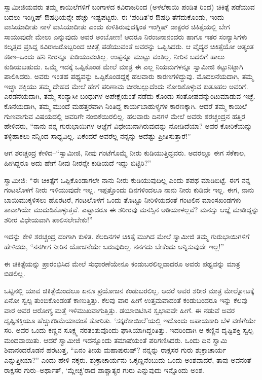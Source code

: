 ಸ್ವಾಮೀಜಿಯವರು ತಮ್ಮ ಕಾಯಿಲೆಗಳಿಗೆ ಬಂಗಾಳದ ಕವಿರಾಜರಿಂದ (ಅಳಲೆಕಾಯಿ ಪಂಡಿತ ರಿಂದ) ಚಿಕಿತ್ಸೆ ಪಡೆಯುವ ಬದಲು ಇಂಗ್ಲಿಷ್ ಔಷಧಿಯನ್ನೇ ಹೆಚ್ಚು ಇಷ್ಟಪಟ್ಟರು. ಈ ‘ಪಂಡಿತ’ರ ಔಷಧಿ ತೆಗೆದುಕೊಂಡು, ಇಂದು ವಾಸಿಯಾದೀತು ನಾಳೆ ವಾಸಿಯಾದೀತು ಎಂದು ಕುಳಿತಿರುವುದಕ್ಕಿಂತ ಇಂಗ್ಲಿಷ್ ಡಾಕ್ಟರರ ಚಿಕಿತ್ಸೆಯಲ್ಲಿ ಬೇಗ ಸಾಯುವುದೇ ಮೇಲು ಎನ್ನುವುದು ಅವರ ಅಂಬೋಣ! ಆದರೂ ನಿರಂಜನಾನಂದರು ಹಾಗೂ ಇತರ ಸಂನ್ಯಾಸಿಗಳು ಕಲ್ಕತ್ತದ ಪ್ರಸಿದ್ದ ಕವಿರಾಜರೊಬ್ಬರಿಂದ ಚಿಕಿತ್ಸೆ ಪಡೆಯುವಂತೆ ಅವರನ್ನು ಒಪ್ಪಿಸಿದರು. ಆ ವೈದ್ಯರ ಚಿಕಿತ್ಸೆಯೋ ಅತ್ಯಂತ ಕಠಿಣ–ಒಂದು ಹನಿ ನೀರನ್ನೂ ಕುಡಿಯುವಂತಿಲ್ಲ. ಉಪ್ಪನ್ನೂ ಮುಟ್ಟು ವಂತಿಲ್ಲ. ನೀರಿನ ಬದಲಿಗೆ ಹಾಲು ಕುಡಿಯಬಹುದು. ಒಮ್ಮೆ ಇದಕ್ಕೆ ಒಪ್ಪಿಕೊಂಡ ಮೇಲೆ ಮಾತ್ರ ಈ ಎಲ್ಲ ನಿಯಮಗಳನ್ನೂ ಸ್ವಾಮೀಜಿ ಕಟ್ಟುನಿಟ್ಟಾಗಿ ಪಾಲಿಸಿದರು. ಅವರು ಇಂತಹ ಪಥ್ಯವನ್ನು ಒಪ್ಪಿಕೊಂಡದ್ದಕ್ಕೆ ಹಲವಾರು ಕಾರಣಗಳಿದ್ದುವು. ಮೊದಲನೆಯದಾಗಿ, ತಮ್ಮ ಇಚ್ಛಾ ಶಕ್ತಿಯು ತಮ್ಮ ದೇಹದ ಮೇಲೆ ಹೇಗೆ ಪರಿಣಾಮ ಬೀರಬಲ್ಲುದೆಂದು ನೋಡಿಕೊಳ್ಳುವ ಕುತೂಹಲ ಅವರಿಗೆ. ಎರಡನೆಯದಾಗಿ, ತಮ್ಮ ಸಂನ್ಯಾಸೀ ಬಂಧುಗಳ ಅಪೇಕ್ಷೆಯಂತೆ ನಡೆದು ಕೊಂಡು ಸಂತೋಷವನ್ನುಂಟುಮಾಡುವ ಇಚ್ಛೆ. ಕೊನೆಯದಾಗಿ, ತಮ್ಮ ಮುಂದೆ ಮಹತ್ತರವಾಗಿ ನಿಂತಿದ್ದ ಕಾರ್ಯಬಾಹುಳ್ಯಗಳ ಕಾರಣಕ್ಕಾಗಿ. ಆದರೆ ತಮ್ಮ ಕಾಯಿಲೆ ಗುಣವಾಗುವ ವಿಷಯದಲ್ಲಿ ಅವರಿಗೇ ನಂಬಿಕೆಯಿರಲಿಲ್ಲ. ಹಲವಾರು ದಿನಗಳ ಮೇಲೆ ಅವರು ಶರಚ್ಚಂದ್ರನ ಹತ್ತಿರ ಹೇಳಿದರು, “ನಾನು ನನ್ನ ಗುರುಭಾಯಿಗಳ ಆಜ್ಞೆಗೆ ವಿಧೇಯನಾಗಿರುವುದನ್ನು ನೋಡಿದೆಯಾ? ಅವರ ಕೋರಿಕೆಯನ್ನು ತಳ್ಳಿಹಾಕಲು ನನ್ನಿಂದ ಸಾಧ್ಯವಿಲ್ಲ. ಏಕೆಂದರೆ ಅವರೆಲ್ಲ ನನ್ನನ್ನು ಅದೆಷ್ಟು ಪ್ರೀತಿಸುತ್ತಾರೆ!”

ಆಗ ಶರಚ್ಚಂದ್ರ ಕೇಳಿದ–“ಸ್ವಾಮೀಜಿ, ನೀವು ಗಂಟೆಗೊಮ್ಮೆ ನೀರು ಕುಡಿಯುತ್ತಿದ್ದವರು. ಅದರಲ್ಲೂ ಈಗ ಸೆಕೆಕಾಲ, ಹೀಗಿದ್ದರೂ ಅದು ಹೇಗೆ ನೀವು ನೀರನ್ನೇ ಕುಡಿಯದೆ ಇದ್ದು ಬಿಟ್ಟಿರಿ?”

ಸ್ವಾಮೀಜಿ: “ಈ ಚಿಕಿತ್ಸೆಗೆ ಒಪ್ಪಿಕೊಂಡಾಗಲೇ ನಾನು ನೀರು ಕುಡಿಯುವುದಿಲ್ಲ ಎಂದು ಶಪಥ ಮಾಡಿಬಿಟ್ಟೆ. ಈಗ ನನ್ನ ಗಂಟಲೊಳಗೆ ನೀರು ಇಳಿಯುವುದೇ ಇಲ್ಲ. ಇಪ್ಪತ್ತೊಂದು ದಿನಗಳಿಂದಲೂ ನಾನು ನೀರು ಕುಡಿದೇ ಇಲ್ಲ. ಈಗ, ನಾನು ಬಾಯಿಮುಕ್ಕಳಿಸಲು ಹೊರಟರೆ, ಗಂಟಲೊಳಗೆ ಒಂದು ತೊಟ್ಟೂ ನೀರಿಳಿಯದಂತೆ ಗಂಟಲಿನ ಮಾಂಸಖಂಡಗಳು ತಾವಾಗಿಯೇ ಮುದುಡಿಕೊಳ್ಳುತ್ತವೆ. ಎಷ್ಟಾದರೂ ಈ ಶರೀರವು ಮನಸ್ಸಿನ ಅಡಿಯಾಳಲ್ಲವೆ? ಮನಸ್ಸು ಆಜ್ಞೆ ಮಾಡಿದ್ದನ್ನು ಶರೀರ ವಿಧೇಯವಾಗಿ ಪಾಲಿಸಲೇಬೇಕು!”

ಇದನ್ನು ಕೇಳಿ ಶರಚ್ಚಂದ್ರ ದಂಗಾಗಿ ಕುಳಿತ. ಕೆಲದಿನಗಳ ಚಿಕಿತ್ಸೆ ಮುಗಿದ ಮೇಲೆ ಸ್ವಾಮೀಜಿ ತಮ್ಮ ಗುರುಭಾಯಿಗಳಿಗೆ ಹೇಳಿದರು, “ನನಗೀಗ ನೀರಿನ ಯೋಚನೆಯೇ ಬರುವುದಿಲ್ಲ. ನನಗದು ಬೇಕೆಂದು ಅನ್ನಿಸುವುದೇ ಇಲ್ಲ!”

ಈ ಚಿಕಿತ್ಸೆಯನ್ನು ಪ್ರಾರಂಭಿಸಿದ ಮೇಲೆ ಸುಧಾರಣೆಯೇನೂ ಕಂಡುಬರಲಿಲ್ಲವಾದರೂ ಅವರು ಪಥ್ಯವನ್ನು ಮಾತ್ರ ಬಿಡಲಿಲ್ಲ.

ಒಟ್ಟಿನಲ್ಲಿ ಯಾವ ಚಿಕಿತ್ಸೆಯಿಂದಲೂ ಏನೂ ಪ್ರಯೋಜನ ಕಂಡುಬರಲಿಲ್ಲ. ಆದರೆ ಅವರ ಶರೀರ ಮಾತ್ರ ಮೇಲ್ನೋಟಕ್ಕೆ ಏನೋ ಸ್ವಲ್ಪ ತುಂಬಿಕೊಂಡಂತೆ ಕಾಣುತ್ತಿತ್ತು. ಕೆಲವು ವಾರ ಹೀಗೆ ಉತ್ತಮವಾದಂತೆ ಕಂಡುಬಂದರೂ ಇನ್ನು ಕೆಲವು ವಾರ ಅವರ ಆರೋಗ್ಯ ಮತ್ತೆ ಇಳಿಮುಖವಾಗುತ್ತಿತ್ತು. ಡಯಾಬಿಟಿಸಿನ ಸ್ವಭಾವವೇ ಹೀಗೆ. ಈ ನಡುವೆ ಅವರ ದೃಷ್ಟಿಶಕ್ತಿಯೂ ಹೆಚ್ಚುಕಡಿಮೆಯಾದಂತೆ ತೋರಿತು. ‘ಸಕ್ಕರೆಕಾಯಿಲೆ’ಯಲ್ಲಿ ಇದೊಂದು ಅಪಾಯಕಾರಿ ಬೆಳ ವಣಿಗೆಯೇ ಸರಿ. ಅವರ ಒಂದು ಕಣ್ಣಿನ ಸೂಕ್ಷ್ಮ ನರತಂತುವೊಂದು ಘಾಸಿಯಾಗಿದ್ದಂತಿತ್ತು. ಇದರಿಂದಾಗಿ ಆ ಕಣ್ಣಿನ ದೃಷ್ಟಿಶಕ್ತಿ ಸ್ವಲ್ಪ ಮಂದವಾಯಿತು. ಆದರೆ ಸ್ವಾಮೀಜಿ ಇದನ್ನೊಂದು ತಮಾಷೆಯಂತೆ ಪರಿಗಣಿಸಿದರು. ಒಂದು ದಿನ ಸ್ವಾಮಿ ಶಿವಾನಂದರೊಡನೆ ಹರಟುತ್ತ, “ಏನಂ ತೀಯ ಮಹಾಪುರುಷ್? ನನ್ನನ್ನು ರಾಕ್ಷಸರ ಗುರು ಶುಕ್ರಾಚಾರ್ಯ ಎನ್ನುತ್ತೀಯಾ?” ಎಂದು ಹೇಳಿ ನಕ್ಕರು. ಶುಕ್ರಾಚಾರ್ಯನು ಒಕ್ಕಣ್ಣನೆಂಬುದು ಒಂದು ಅಂಶವಾದರೆ, ತಾವು ಅವನಂತೆ ರಾಕ್ಷಸರ ಗುರು–ಅರ್ಥಾತ್, ‘ಮ್ಲೇಚ್ಛ’ರಾದ ಪಾಶ್ಚಾತ್ಯರ ಗುರು ಎನ್ನುವುದು ಇನ್ನೊಂದು ಅಂಶ.

